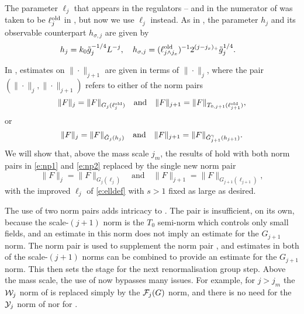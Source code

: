 The parameter $\ell_j$ that appears in the regulators -- and
in the numerator of  was taken to be $\ell_j^{\mathrm{old}}$ in \cite{BS-rg-IE},
but now we use $\ell_j$ instead. As in \cite{BS-rg-IE},
the parameter $h_j$ and its observable counterpart $h_{\sigma,j}$ are given by
\begin{align}
\label{e:h}
    h_{j} &= k_0 \tilde{g}_j^{-1/4}L^{-j},
    \quad
    h_{\sigma,j}  = (\ell_{j \wedge j_{x}}^{\rm old})^{-1}
    2^{(j - j_{x})_+}\tilde{g}_j^{1/4}.
\end{align}

In \cite{BS-rg-IE}, estimates on $\|\cdot\|_{j+1}$ are given in terms of
$\|\cdot\|_j$, where the pair $(\|\cdot\|_j, \|\cdot\|_{j+1})$ refers to
either of the norm pairs
\begin{equation}
\label{e:np1}
    \|F\|_j = \|F\|_{G_j(\ell_j^{\mathrm{old}})}
    \quad \text{and} \quad
    \|F\|_{j+1} = \|F\|_{T_{0,j+1}(\ell_{j+1}^{\mathrm{old}})},
\end{equation}
or
\begin{equation}
\label{e:np2}
    \|F\|_j = \|F\|_{\tilde{G}_j(h_j)}
    \quad \text{and} \quad
    \|F\|_{j+1} = \|F\|_{\tilde{G}_{j+1}^{\gamma}(h_{j+1})}.
\end{equation}
We will show that, above the mass scale $j_m$, the results of \cite{BS-rg-IE} hold with
both norm pairs in \eqref{e:np1} and \eqref{e:np2} replaced by the single new norm pair
\begin{equation}
\label{e:npmass}
    \|F\|_j = \|F\|_{G_j(\ell_j)}
    \quad \text{and} \quad
    \|F\|_{j+1} = \|F\|_{G_{j+1}(\ell_{j+1})},
\end{equation}
with the improved $\ell_j$ of \eqref{e:elldef} with $s > 1$ fixed as large as desired.


The use of two norm pairs adds intricacy to \cite{BS-rg-IE,BS-rg-step}.
The pair  is insufficient, on its own, because the scale-$(j+1)$ norm
is the $T_0$ semi-norm which controls only small fields, and an estimate in this norm
does not imply an estimate for the $G_{j+1}$ norm.  The norm pair  is
used to supplement the norm pair , and estimates in both of the scale-$(j+1)$
norms can be combined to provide an estimate for the $G_{j+1}$ norm.  This then
sets the stage for the next renormalisation group step.  Above the mass scale,
the use of  now bypasses many issues.  For example, for $j>j_m$
 the $\mathcal{W}_j$ norm of \cite[\eqref{step-e:9Kcalnorm}]{BS-rg-step} is replaced
 simply by the $\mathcal{F}_j(G)$ norm, and there is no need for the $\mathcal{Y}_j$ norm of
\cite[\eqref{step-e:Ycaldef}]{BS-rg-step} nor for \cite[Lemma~\ref{step-lem:KKK}]{BS-rg-step}.

